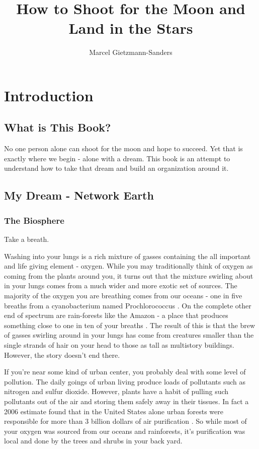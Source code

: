 \documentclass[11pt,a5paper]{book}
\title{How to Shoot for the Moon and Land in the Stars}
\author{Marcel Gietzmann-Sanders}
\date{}
\begin{document}
\maketitle
\tableofcontents
\newpage
\part{Introduction}
\chapter{What is This Book?}
No one person alone can shoot for the moon and hope to succeed. Yet that is exactly where we begin - alone with a dream. This book is an attempt to understand how to take that dream and build an organization around it.
\chapter{My Dream - Network Earth}
\section{The Biosphere}
Take a breath. 
\newline

Washing into your lungs is a rich mixture of gasses containing the all important and life giving element - oxygen. While you may traditionally think of oxygen as coming from the plants around you, it turns out that the mixture swirling about in your lungs comes from a much wider and more exotic set of sources. The majority of the oxygen you are breathing comes from our oceans - one in five breaths from a cyanobacterium named Prochlorococcus \cite{kmorsink}. On the complete other end of spectrum are rain-forests like the Amazon - a place that produces something close to one in ten of your breaths \cite{ymalhi}. The result of this is that the brew of gasses swirling around in your lungs has come from creatures smaller than the single strands of hair on your head to those as tall as multistory buildings. However, the story doesn't end there.
\newline

If you're near some kind of urban center, you probably deal with some level of pollution. The daily goings of urban living produce loads of pollutants such as nitrogen and sulfur dioxide. However, plants have a habit of pulling such pollutants out of the air and storing them safely away in their tissues. In fact a 2006 estimate found that in the United States alone urban forests were responsible for more than 3 billion dollars of air purification \cite{dnowak}. So while most of your oxygen was sourced from our oceans and rainforests, it's purification was local and done by the trees and shrubs in your back yard. 
\newline
\end{document}
